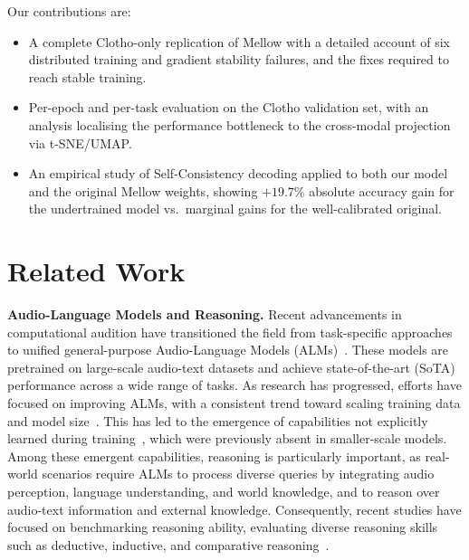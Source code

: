\documentclass[cameraready]{Interspeech}
\begin{document}
\noindent Our contributions are:                                                \begin{itemize}                                                                 \item A complete Clotho-only replication of Mellow with a detailed account of six distributed training and gradient stability failures, and the fixes required to reach stable training.                                              \item Per-epoch and per-task evaluation on the Clotho validation set, with an analysis localising the performance bottleneck to the cross-modal projection via t-SNE/UMAP.                                                                 \item An empirical study of Self-Consistency decoding applied to both our model and the original Mellow weights, showing $+19.7\%$ absolute accuracy gain for the undertrained model vs.\ marginal gains for the well-calibrated original.    \end{itemize}



\section{Related Work}
\label{sec:related}
\textbf{Audio-Language Models and Reasoning.} Recent advancements in computational audition have transitioned the field from task-specific approaches~\cite{deshmukh2021improving, kong2020panns} to unified general-purpose Audio-Language Models (ALMs)~\cite{deshmukh2023pengi, elizalde2023clap}. These models are pretrained on large-scale audio-text datasets and achieve state-of-the-art (SoTA) performance across a wide range of tasks. As research has progressed, efforts have focused on improving ALMs, with a consistent trend toward scaling training data and model size~\cite{chu2024qwen2audio, gong2024listen, tang2024salmonn}. This has led to the emergence of capabilities not explicitly learned during training~\cite{deshmukh2024pam, deshmukh2024audio}, which were previously absent in smaller-scale models. Among these emergent capabilities, reasoning is particularly important, as real-world scenarios require ALMs to process diverse queries by integrating audio perception, language understanding, and world knowledge, and to reason over audio-text information and external knowledge. Consequently, recent studies have focused on benchmarking reasoning ability, evaluating diverse reasoning skills such as deductive, inductive, and comparative reasoning~\cite{deshmukh2024audio, deshmukh2025adiff, sakshi2024mmau}.
\end{document}
